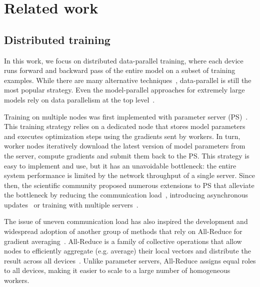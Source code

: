 \section{Related work}\label{sect:related}

\subsection{Distributed training}\label{sect:related_distributed}

In this work, we focus on distributed data-parallel training, where each device runs forward and backward pass of the entire model on a subset of training examples. While there are many alternative techniques~\cite{huang2019gpipe,shazeer2017outrageously,zero}, data-parallel is still the most popular strategy. Even the model-parallel approaches for extremely large models rely on data parallelism at the top level~\cite{zero,megatron2,switch}.

Training on multiple nodes was first implemented with parameter server (PS)~\cite{ps}. This training strategy relies on a dedicated node that stores model parameters and executes optimization steps using the gradients sent by workers. 
In turn, worker nodes iteratively download the latest version of model parameters from the server, compute gradients and submit them back to the PS. This strategy is easy to implement and use, but it has an unavoidable bottleneck: the entire system performance is limited by the network throughput of a single server. Since then, the scientific community proposed numerous extensions to PS that alleviate the bottleneck by reducing the communication load~\cite{deepgradientcompression,localsgd_first,Stich18local,koloskova2020decentralized,li2020acceleration}, introducing asynchronous updates~\cite{recht2011hogwild,projectadam} or training with multiple servers~\cite{sharded_ps_first, byteps}.


The issue of uneven communication load has also inspired the development and widespread adoption of another group of methods that rely on All-Reduce for gradient averaging~\cite{goyal2017accurate,mikami2019massively,lamb}. All-Reduce is a family of collective operations that allow nodes to efficiently aggregate (e.g. average) their local vectors and distribute the result across all devices~\cite{ringallreduce,mpich_rabenseifner,torus_allreduce}. Unlike parameter servers, All-Reduce assigns equal roles to all devices, making it easier to scale to a large number of homogeneous workers.

